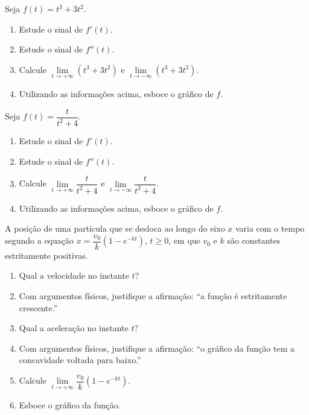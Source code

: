 \begin{exercicio}[7]
Seja $f(t) = t^3 + 3t^2$.
\begin{enumerate}[label=\alph*)]
    \item Estude o sinal de $f'(t)$.
    \item Estude o sinal de $f''(t)$.
    \item Calcule $\lim\limits_{t \to +\infty} (t^3 + 3t^2)$ e $\lim\limits_{t \to -\infty} (t^3 + 3t^2)$.
    \item Utilizando as informações acima, esboce o gráfico de $f$.
\end{enumerate}
\end{exercicio}

\begin{exercicio}[8]
Seja $f(t) = \dfrac{t}{t^2 + 4}$.
\begin{enumerate}[label=\alph*)]
    \item Estude o sinal de $f'(t)$.
    \item Estude o sinal de $f''(t)$.
    \item Calcule $\lim\limits_{t \to +\infty} \dfrac{t}{t^2 + 4}$ e $\lim\limits_{t \to -\infty} \dfrac{t}{t^2 + 4}$.
    \item Utilizando as informações acima, esboce o gráfico de $f$.
\end{enumerate}
\end{exercicio}

\begin{exercicio}[9]
A posição de uma partícula que se desloca ao longo do eixo $x$ varia com o tempo segundo a equação $x = \dfrac{v_0}{k}(1 - e^{-kt})$, $t \ge 0$, em que $v_0$ e $k$ são constantes estritamente positivas.
\begin{enumerate}[label=\alph*)]
    \item Qual a velocidade no instante $t$?
    \item Com argumentos físicos, justifique a afirmação: ``a função é estritamente crescente.''
    \item Qual a aceleração no instante $t$?
    \item Com argumentos físicos, justifique a afirmação: ``o gráfico da função tem a concavidade voltada para baixo.''
    \item Calcule $\lim\limits_{t \to +\infty} \dfrac{v_0}{k}(1 - e^{-kt})$.
    \item Esboce o gráfico da função.
\end{enumerate}
\end{exercicio}

